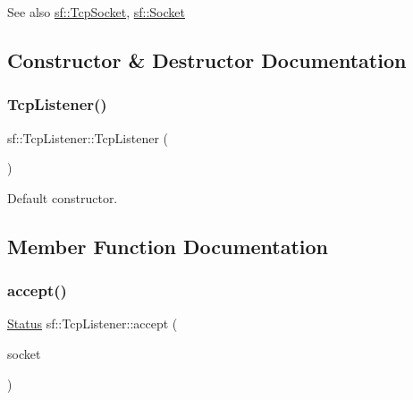 \begin{DoxySeeAlso}{See also}
\mbox{\hyperlink{classsf_1_1_tcp_socket}{sf\+::\+Tcp\+Socket}}, \mbox{\hyperlink{classsf_1_1_socket}{sf\+::\+Socket}} \begin{DoxyVerb}\end{DoxyVerb}
 
\end{DoxySeeAlso}


\subsection{Constructor \& Destructor Documentation}
\mbox{\label{classsf_1_1_tcp_listener_a59a1db5b6f4711a3e57390da2f8d9630}} 
\subsubsection{\texorpdfstring{TcpListener()}{TcpListener()}}
{\footnotesize\ttfamily sf\+::\+Tcp\+Listener\+::\+Tcp\+Listener (\begin{DoxyParamCaption}{ }\end{DoxyParamCaption})}



Default constructor. 

\begin{DoxyVerb}\end{DoxyVerb}
 

\subsection{Member Function Documentation}
\mbox{\label{classsf_1_1_tcp_listener_ae2c83ce5a64d50b68180c46bef0a7346}} 
\subsubsection{\texorpdfstring{accept()}{accept()}}
{\footnotesize\ttfamily \mbox{\hyperlink{classsf_1_1_socket_a51bf0fd51057b98a10fbb866246176dc}{Status}} sf\+::\+Tcp\+Listener\+::accept (\begin{DoxyParamCaption}\item[{\mbox{\hyperlink{classsf_1_1_tcp_socket}{Tcp\+Socket}} \&}]{socket }\end{DoxyParamCaption})}



